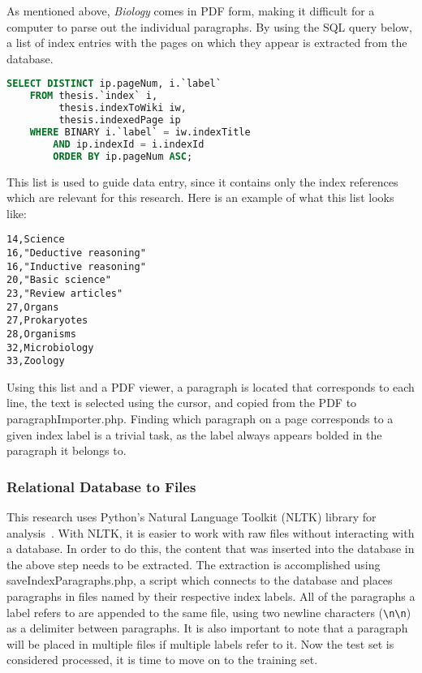 As mentioned above, {\it Biology} comes in PDF form, making it difficult for a computer to parse out the individual paragraphs.
By using the SQL query below, a list of index entries with the pages on which they appear is extracted from the database.

\begin{lstlisting}[language=SQL]
SELECT DISTINCT ip.pageNum, i.`label`
    FROM thesis.`index` i,
         thesis.indexToWiki iw,
         thesis.indexedPage ip
    WHERE BINARY i.`label` = iw.indexTitle
        AND ip.indexId = i.indexId
        ORDER BY ip.pageNum ASC;
\end{lstlisting}

This list is used to guide data entry, since it contains only the index references which are relevant for this research.
Here is an example of what this list looks like:

\begin{multicols}{2}
\begin{verbatim}
14,Science
16,"Deductive reasoning"
16,"Inductive reasoning"
20,"Basic science"
23,"Review articles"
27,Organs
27,Prokaryotes
28,Organisms
32,Microbiology
33,Zoology
\end{verbatim}
\end{multicols}

Using this list and a PDF viewer, a paragraph is located that corresponds to each line, the text is selected using the cursor, and copied from the PDF to paragraphImporter.php.
Finding which paragraph on a page corresponds to a given index label is a trivial task, as the label always appears bolded in the paragraph it belongs to.

\subsubsection{Relational Database to Files}
\label{subsubsec:RDB2F}

This research uses Python's Natural Language Toolkit (NLTK) library for analysis~\cite{nltk}.
With NLTK, it is easier to work with raw files without interacting with a database.
In order to do this, the content that was inserted into the database in the above step needs to be extracted.
The extraction is accomplished using saveIndexParagraphs.php, a script which connects to the database and places paragraphs in files named by their respective index labels.
All of the paragraphs a label refers to are appended to the same file, using two newline characters ({\tt{\textbackslash}n{\textbackslash}n}) as a delimiter between paragraphs.
It is also important to note that a paragraph will be placed in multiple files if multiple labels refer to it.
Now the test set is considered processed, it is time to move on to the training set.

